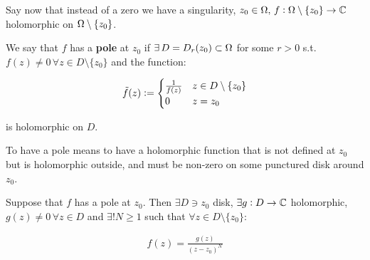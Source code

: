 Say now that instead of a zero we have a singularity, $z_0 \in \Omega , \, f: \Omega \setminus \{ z_0 \} \to \mathbb{C}$ holomorphic on $\Omega \setminus \{ z_0 \}$.


\begin{center}
\end{center}



\begin{definition}[Poles]
We say that $f$ has a \textbf{pole} at $z_0$ if $\exists \, D = D_r(z_0) \subset \Omega$ for some $r>0$ s.t. $f(z) \neq 0 \, \forall z \in D \setminus \{ z_0 \}$ and the function:

\begin{align*}
    \Tilde{f}(z) \vcentcolon = \begin{cases} \frac{1}{f(z)} & z \in D \setminus \{ z_0 \} \\ 0 & z = z_0  \end{cases}
\end{align*}

is holomorphic on $D$.

\end{definition}

To have a pole means to have a holomorphic function that is not defined at $z_0$  but is holomorphic outside, and must be non-zero on some punctured disk around $z_0$.



\begin{lemma}
Suppose that $f$ has a pole at $z_0$. Then $\exists D \ni z_0$ disk, $\exists g: D \to \mathbb{C} $ holomorphic, $g(z) \neq 0 \, \forall z \in D$ and $\exists ! N \geq 1$ such that $\forall z\in D \setminus \{ z_0 \}$:

\begin{align*}
f(z) = \frac{g(z)}{(z-z_0)^N}    
\end{align*}

\end{lemma}

